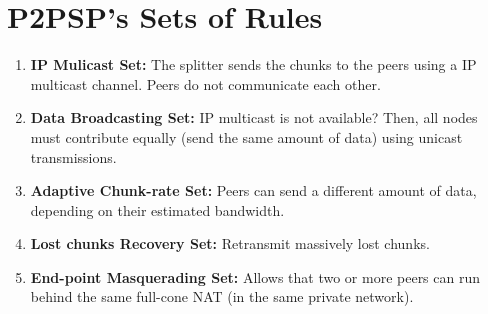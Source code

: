 \documentclass{article}
\begin{document}
\large
\section{P2PSP's Sets of Rules}
\begin{enumerate}
\item \textbf{IP Mulicast Set:} The splitter sends the chunks to
  the peers using a IP multicast channel. Peers do not communicate
  each other.

\ifx \HCode\Undfef
\else
{}
\fi

\item \textbf{Data Broadcasting Set:} IP multicast is not available? Then, all nodes must contribute
  equally (send the same amount of data) using unicast transmissions.

\ifx \HCode\Undfef
\else
{}
\fi

\item \textbf{Adaptive Chunk-rate Set:} Peers can send a different
  amount of data, depending on their estimated bandwidth.

\ifx \HCode\Undfef
\else
{}
\fi

\item \textbf{Lost chunks Recovery Set:} Retransmit massively lost
  chunks.

\ifx \HCode\Undfef
\else
{}
\fi

\item \textbf{End-point Masquerading Set:} Allows that two or more peers can
  run behind the same full-cone NAT (in the same private network).


\end{enumerate}
\end{document}
